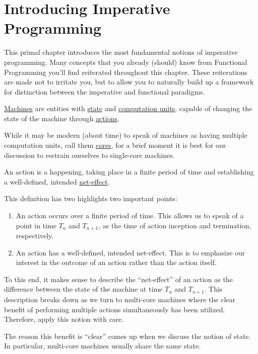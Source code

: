 \chapter{Introducing Imperative Programming}

This primal chapter introduces the most fundamental notions of imperative
programming. Many concepts that you already (should) know from Functional
Programming you'll find reiterated throughout this chapter. These reiterations
are made not to irritate you, but to allow you to naturally build up a
framework for distinction between the imperative and functional paradigms.

\begin{definition}

\underline{Machines} are entities with \underline{state} and
\underline{computation units}, capable of changing the state of the machine
through \underline{actions}.

\end{definition}

While it may be modern (about time) to speak of machines as having multiple
computation units, call them \underline{cores}, for a brief moment it is best
for our discussion to restrain ourselves to single-core machines.

\begin{definition}

An action is a happening, taking place in a finite period of time and
establishing a well-defined, intended \underline{net-effect}.
\cite{dijkstra-introduction}

\end{definition}

This definition has two highlights two important points:

\begin{enumerate}

\item An action occurs over a finite period of time. This allows us to speak of
a point in time $T_n$ and $T_{n+1}$, as the time of action inception and
termination, respectively.

\item An action has a well-defined, intended net-effect. This is to emphasize
our interest in the outcome of an action rather than the action itself.

\end{enumerate}

To this end, it makes sense to describe the ``net-effect'' of an action as the
difference between the state of the machine at time $T_n$ and $T_{n+1}$. This
description breaks down as we turn to multi-core machines where the clear
benefit of performing multiple actions simultaneously has been utilized.
Therefore, apply this notion with care.

The reason this benefit is ``clear'' comes up when we discuss the notion of
state. In particular, multi-core machines usually share the same state.





